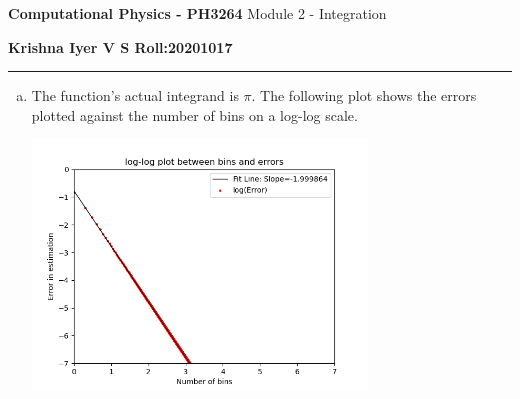 \documentclass[12 pt]{article}
\begin{document}
\begin{center}
       \large{
       \textbf{Computational Physics - PH3264} \break
	Module 2 - Integration
}
\end{center}

\textbf{Krishna Iyer V S \hfill Roll:20201017}
\hrule 
\vspace{0.3cm}

\begin{enumerate}[a.]

\item The function's actual integrand is $\pi$. The following plot shows the errors plotted against the number of bins on a log-log scale.
\begin{center}
\includegraphics[width=3.5in]{"plots/log_log_q1_a.png"}
\end{center}
\end{enumerate}
\end{document}
